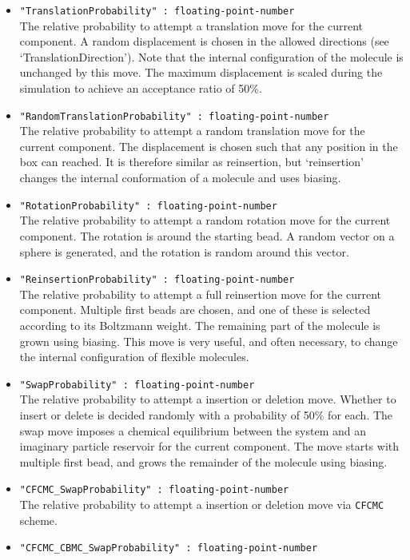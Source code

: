 \begin{itemize}
\item{\verb+"TranslationProbability" : floating-point-number+}\\
The relative probability to attempt a translation move for the current component. 
A random displacement is chosen in the allowed directions (see `TranslationDirection').
Note that the internal configuration of the molecule is unchanged by this move. 
The maximum displacement is scaled during the simulation to achieve an acceptance
ratio of 50\%.
\item{\verb+"RandomTranslationProbability" : floating-point-number+}\\
The relative probability to attempt a random translation move for the current component. 
The displacement is chosen such that any position in the box can reached. It is therefore
similar as reinsertion, but `reinsertion' changes the internal conformation of a molecule and uses biasing.
\item{\verb+"RotationProbability" : floating-point-number+}\\
The relative probability to attempt a random rotation move for the current component. 
The rotation is around the starting bead. A random vector on a sphere
is generated, and the rotation is random around this vector.
\item{\verb+"ReinsertionProbability" : floating-point-number+}\\
The relative probability to attempt a full reinsertion move for the current component. 
Multiple first beads are chosen, and one of these is selected according to its Boltzmann weight.
The remaining part of the molecule is grown using biasing. 
This move is very useful, and often necessary, to change the internal configuration of flexible molecules.
\item{\verb+"SwapProbability" : floating-point-number+}\\
The relative probability to attempt a insertion or deletion move. 
Whether to insert or delete is decided randomly with a probability of 50\% for each.
The swap move imposes a chemical equilibrium between the system and 
an imaginary particle reservoir for the current component. 
The move starts with multiple first bead, and
grows the remainder of the molecule using biasing.
\item{\verb+"CFCMC_SwapProbability" : floating-point-number+}\\
  The relative probability to attempt a insertion or deletion move via \texttt{CFCMC} scheme.
\item{\verb+"CFCMC_CBMC_SwapProbability" : floating-point-number+}\\

\end{itemize}
